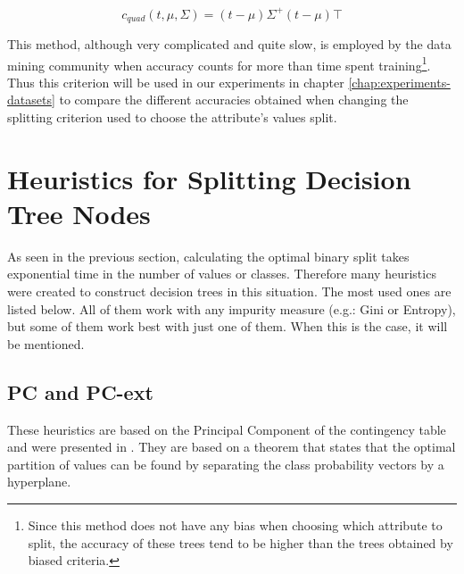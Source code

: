 \begin{equation}
\label{eq:c_quad}
c_{quad}(t, \mu, \Sigma) = (t-\mu)\Sigma^+(t-\mu)\top
\end{equation}

This method, although very complicated and quite slow, is employed by the data mining community when accuracy counts for more than time spent training\footnote{Since this method does not have any bias when choosing which attribute to split, the accuracy of these trees tend to be higher than the trees obtained by biased criteria.}. Thus this criterion will be used in our experiments in chapter \ref{chap:experiments-datasets} to compare the different accuracies obtained when changing the splitting criterion used to choose the attribute's values split.

\section{Heuristics for Splitting Decision Tree Nodes}
As seen in the previous section, calculating the optimal binary split takes exponential time in the number of values or classes. Therefore many heuristics were created to construct decision trees in this situation. The most used ones are listed below. All of them work with any impurity measure (e.g.: Gini or Entropy), but some of them work best with just one of them. When this is the case, it will be mentioned.

%
%
\subsection{PC and PC-ext}
These heuristics are based on the Principal Component of the contingency table and were presented in \cite{journals/datamine/CoppersmithHH99}.
They are based on a theorem that states that the optimal partition of values can be found by separating the class probability vectors by a hyperplane.

